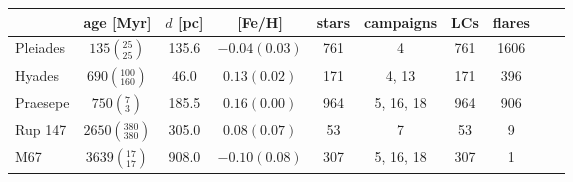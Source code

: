 \begin{tabular}{lccccccccr}
\hline
          &                   age [Myr] &  $d$ [pc] &     [Fe/H] &  stars &    campaigns &  LCs &  flares \\
\hline
 Pleiades &     $135\left(_{25}^{25}\right)$ &         135.6 &  $-0.04(0.03)$ &    761 &          4 &  761 &    1606 \\
   Hyades &   $690\left(_{160}^{100}\right)$ &          46.0 &   $0.13(0.02)$ &    171 &      4, 13 &  171 &     396 \\
 Praesepe &       $750\left(_{3}^{7}\right)$ &         185.5 &   $0.16(0.00)$ &    964 &  5, 16, 18 &  964 &     906 \\
  Rup 147 &  $2650\left(_{380}^{380}\right)$ &         305.0 &   $0.08(0.07)$ &     53 &          7 &   53 &       9 \\
      M67 &    $3639\left(_{17}^{17}\right)$ &         908.0 &  $-0.10(0.08)$ &    307 &  5, 16, 18 &  307 &       1 \\
\hline

\end{tabular}
